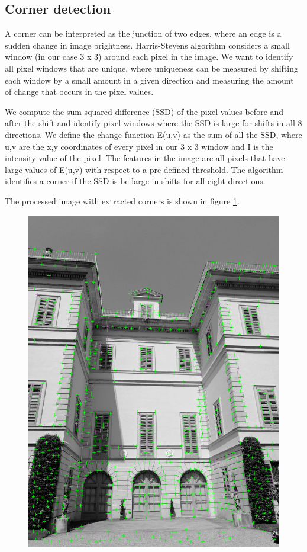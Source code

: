 \documentclass[11pt, oneside]{article}
\begin{document}
\subsection{Corner detection}
A corner can be interpreted as the junction of two edges, where an edge is a sudden change in image brightness. Harris-Stevens algorithm considers a small window (in our case 3 x 3) around each pixel in the image. We want to identify all pixel windows that are unique, where uniqueness can be measured by shifting each window by a small amount in a given direction and measuring the amount of change that occurs in the pixel values.

We compute the sum squared difference (SSD) of the pixel values before and after the shift and identify pixel windows where the SSD is large for shifts in all 8 directions. We define the change function E(u,v) as the sum of all the SSD, where u,v are the x,y coordinates of every pixel in our 3 x 3 window and I is the intensity value of the pixel. The features in the image are all pixels that have large values of E(u,v) with respect to a pre-defined threshold. The algorithm identifies a corner if the SSD is be large in shifts for all eight directions.

The processed image with extracted corners is shown in figure \ref{image_corners}.\\
\begin{figure}[!h]
	\centering
	\includegraphics[width=0.45\linewidth]{image_corners.png}
	\label{image_corners}
\end{figure}
\end{document}

